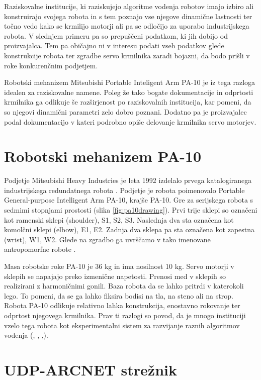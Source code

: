 \documentclass[a4paper]{article}
\begin{document}
Raziskovalne institucije, ki raziskujejo algoritme vodenja robotov imajo izbiro ali konstruirajo svojega robota in s tem poznajo vse njegove dinamične lastnosti ter točno vedo kako se krmilijo motorji ali pa se odločijo za uporabo industrijskega robota. V slednjem primeru pa so prepuščeni podatkom, ki jih dobijo od proizvajalca. Tem pa običajno ni v interesu podati vseh podatkov glede konstrukcije robota ter zgradbe servo krmilnika zaradi bojazni, da bodo prišli v roke konkurenčnim podjetjem.

Robotski mehanizem Mitsubishi Portable Inteligent Arm PA-10 je iz tega razloga idealen za raziskovalne namene. Poleg že tako bogate dokumentacije in odprtosti krmilnika ga odlikuje še razširjenost po raziskovalnih institucija, kar pomeni, da so njegovi dinamični parametri zelo dobro poznani. Dodatno pa je proizvajalec podal dokumentacijo v kateri podrobno opiše delovanje krmilnika servo motorjev. 


\section{Robotski mehanizem PA-10}

Podjetje Mitsubishi Heavy Industries je leta 1992 izdelalo prvega katalogiranega industrijskega redundatnega robota \cite{mhi_pa10}. Podjetje je robota poimenovalo Portable General-purpose Intelligent Arm PA-10, krajše PA-10. Gre za serijskega robota s sedmimi stopnjami prostosti (slika \ref{fig:pa10drawing}). Prvi trije sklepi so označeni kot ramenski sklepi (shoulder), S1, S2, S3. Naslednja dva sta označena kot komolčni sklepi (elbow), E1, E2. Zadnja dva sklepa pa sta označena kot zapestna (wrist), W1, W2. Glede na zgradbo ga uvrščamo v tako imenovane antropomorfne robote \cite{craig_robintro}.

Masa robotske roke PA-10 je 36 kg in ima nosilnost 10 kg. Servo motorji v sklepih se napajajo preko izmenične napetosti. Prenosi med v sklepih so realizirani z harmoničnimi gonili. Baza robota da se lahko pritrdi v katerokoli lego. To pomeni, da se ga lahko fiksira bodisi na tla, na steno ali na strop. Robota PA-10 odlikuje relativno lahka konstrukcija, enostavno rokovanje ter odprtost njegovega krmilnika. Prav ti razlogi so povod, da je mnogo instituciji vzelo tega robota kot eksperimentalni sistem za razvijanje raznih algoritmov vodenja (\cite{voung_pa10}, \cite{aalst_pa10}, \cite{rodrigo_pa10},\cite{petric_nevronska}).

\section{UDP-ARCNET strežnik}
\end{document}
